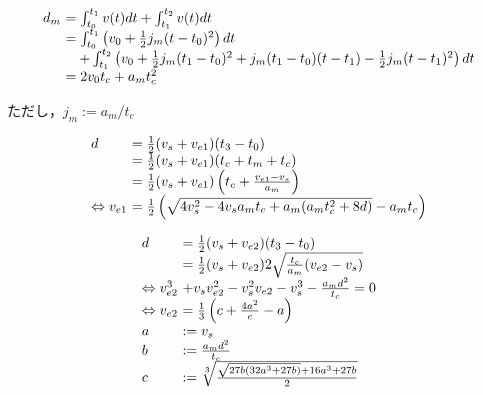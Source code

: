 \documentclass[a5paper]{ltjsarticle}
\begin{document}
$$
    \begin{array}{l@{~}l}
        d_m & =                  \int_{t_0}^{t_1}v(t) dt + \int_{t_1}^{t_2}v(t) dt
        \\
            & =                  \int_{t_0}^{t_1}\left( v_0+\frac{1}{2} j_m(t-t_0)^2 \right) dt
        \\
            & \quad+ \int_{t_1}^{t_2}\left(
        v_0+                     \frac{1}{2} j_m(t_1-t_0)^2
        +j_m(t_1-t_0)(t-t_1) -   \frac{1}{2}j_m(t-t_1)^2
        \right) dt
        \\
            & = 2v_0t_c+a_mt_c^2
    \end{array}
$$

ただし，$j_m:=a_m/t_c$

$$
    \begin{array}{l@{~}l}
        d                      & = \frac{1}{2}(v_s+v_{e1})(t_3-t_0)
        \\
                               & = \frac{1}{2}(v_s+v_{e1})(t_c+t_m+t_c)
        \\
                               & = \frac{1}{2}(v_s+v_{e1})\left(t_c+\frac{v_{e1}-v_s}{a_m}\right)
        \\
        \Leftrightarrow v_{e1} & =
        \frac{1}{2}\left(\sqrt{4v_s^2-4v_sa_mt_c+a_m(a_mt_c^2+8d)}-a_mt_c\right)
    \end{array}
$$

$$
    \begin{array}{l@{~}l}
        d        & =                                                         \frac{1}{2}(v_s+v_{e2})(t_3-t_0)
        \\
                 & =                                                         \frac{1}{2}(v_s+v_{e2})2\sqrt{\frac{t_c}{a_m}(v_{e2}-v_s)}
        \\
        \Leftrightarrow
        v_{e2}^3 & + v_s v_{e2}^2-v_s^2v_{e2}-v_s^3-\frac{a_md^2}{t_c} = 0
        \\
        \Leftrightarrow
        v_{e2}   & =
        \frac{1}{3}\left(c +\frac{4a^2}{c}
        -a
        \right)
        \\
        a        & := v_s
        \\
        b        & :=                                                        \frac{a_md^2}{t_c}
        \\
        c        & :=                                                        \sqrt[3]{\frac{\sqrt{27b(32a^3+27b)} + 16a^3+27b}{2}}
    \end{array}
$$
\end{document}
